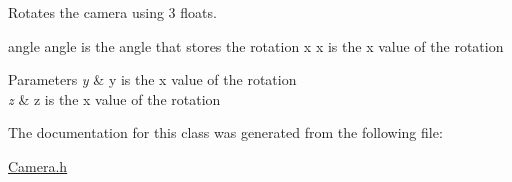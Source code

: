 Rotates the camera using 3 floats. 

\begin{DoxyVerb}                                                                                                                               \param angle angle is the angle that stores the rotation
                                                                                                                               \param x x is the x value of the rotation
\end{DoxyVerb}
 
\begin{DoxyParams}{Parameters}
{\em y} & y is the x value of the rotation \\
\hline
{\em z} & z is the x value of the rotation \\
\hline
\end{DoxyParams}


The documentation for this class was generated from the following file\+:\begin{DoxyCompactItemize}
\item 
\mbox{\hyperlink{_camera_8h}{Camera.\+h}}\end{DoxyCompactItemize}
